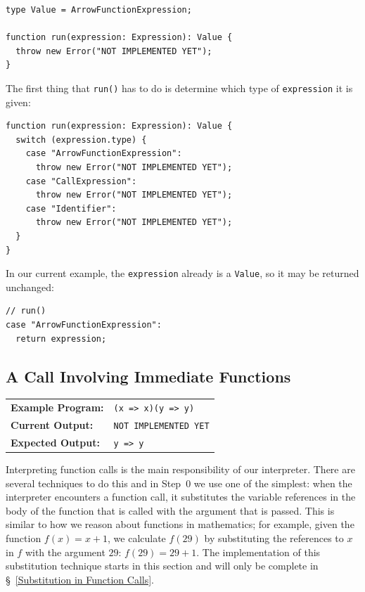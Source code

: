 \documentclass[12pt, oneside]{book}
\begin{document}
\begin{verbatim}
type Value = ArrowFunctionExpression;

function run(expression: Expression): Value {
  throw new Error("NOT IMPLEMENTED YET");
}
\end{verbatim}

The first thing that \texttt{run()} has to do is determine which type of \texttt{expression} it is given:

\begin{verbatim}
function run(expression: Expression): Value {
  switch (expression.type) {
    case "ArrowFunctionExpression":
      throw new Error("NOT IMPLEMENTED YET");
    case "CallExpression":
      throw new Error("NOT IMPLEMENTED YET");
    case "Identifier":
      throw new Error("NOT IMPLEMENTED YET");
  }
}
\end{verbatim}

In our current example, the \texttt{expression} already is a \texttt{Value}, so it may be returned unchanged:

\begin{verbatim}
// run()
case "ArrowFunctionExpression":
  return expression;
\end{verbatim}

\subsection{A Call Involving Immediate Functions}
\label{A Call Involving Immediate Functions}

\begin{center}
\begin{tabular}{ll}
\textbf{Example Program:} & \texttt{(x => x)(y => y)} \\
\textbf{Current Output:} & \texttt{NOT IMPLEMENTED YET} \\
\textbf{Expected Output:} & \texttt{y => y} \\
\end{tabular}
\end{center}

Interpreting function calls is the main responsibility of our interpreter. There are several techniques to do this and in Step~0 we use one of the simplest: when the interpreter encounters a function call, it substitutes the variable references in the body of the function that is called with the argument that is passed. This is similar to how we reason about functions in mathematics; for example, given the function $f(x) = x + 1$, we calculate $f(29)$ by substituting the references to $x$ in $f$ with the argument $29$: $f(29) = 29 + 1$. The implementation of this substitution technique starts in this section and will only be complete in §~\ref{Substitution in Function Calls}.
\end{document}
